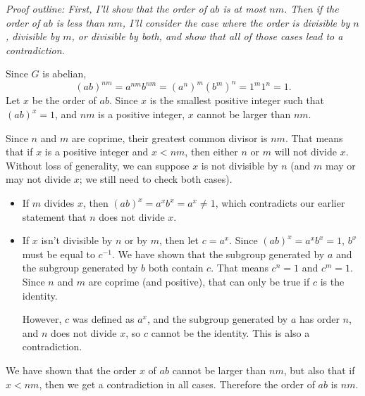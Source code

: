 \documentclass[12pt]{article}
\begin{document}
\textit{Proof outline: First, I'll show that the order of $ab$ is at most $nm$. Then if the order of $ab$ is less than $nm$, I'll consider the case where the order is divisible by $n$, divisible by $m$, or divisible by both, and show that all of those cases lead to a contradiction.}
\bigskip
\par
Since $G$ is abelian,
\[ (ab)^{nm} = a^{nm} b^{nm} = (a^n)^m (b^m)^n = 1^m 1^n = 1. \]
Let $x$ be the order of $ab$. Since $x$ is the smallest positive integer such that $(ab)^x=1$, and $nm$ is a positive integer, $x$ cannot be larger than $nm$.
\par
Since $n$ and $m$ are coprime, their greatest common divisor is $nm$. That means that if $x$ is a positive integer and $x < nm$, then either $n$ or $m$ will not divide $x$. Without loss of generality, we can suppose $x$ is not divisible by $n$ (and $m$ may or may not divide $x$; we still need to check both cases).
\begin{itemize}
    \item If $m$ divides $x$, then $(ab)^x = a^x b^x = a^x \neq 1$, which contradicts our earlier statement that $n$ does not divide $x$.
    \item If $x$ isn't divisible by $n$ or by $m$, then let $c = a^x$. Since $(ab)^x = a^x b^x = 1$, $b^x$ must be equal to $c^{-1}$. We have shown that the subgroup generated by $a$ and the subgroup generated by $b$ both contain $c$. That means $c^n = 1$ and $c^m = 1$. Since $n$ and $m$ are coprime (and positive), that can only be true if $c$ is the identity.
        \par
        However, $c$ was defined as $a^x$, and the subgroup generated by $a$ has order $n$, and $n$ does not divide $x$, so $c$ cannot be the identity. This is also a contradiction.
\end{itemize}
We have shown that the order $x$ of $ab$ cannot be larger than $nm$, but also that if $x < nm$, then we get a contradiction in all cases. Therefore the order of $ab$ is $nm$.

\bigskip
\noindent{}\bigskip
\end{document}
